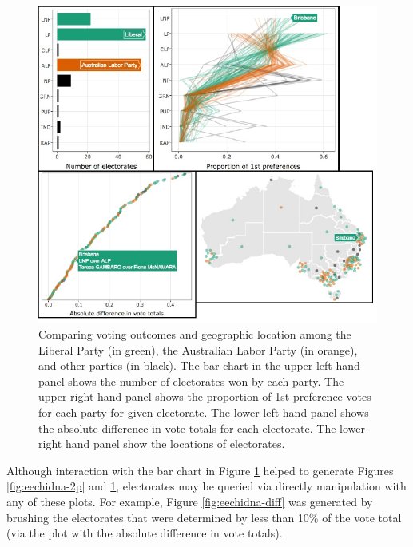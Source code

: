 \documentclass[12pt,]{article}
\theoremstyle{definition}
\theoremstyle{definition}
\theoremstyle{remark}
\begin{document}
\begin{figure}
\centering
\includegraphics{images/eechidna-2p-2.pdf}
\caption{\label{fig:eechidna-2p-2}Comparing voting outcomes and geographic
location among the Liberal Party (in green), the Australian Labor Party
(in orange), and other parties (in black). The bar chart in the
upper-left hand panel shows the number of electorates won by each party.
The upper-right hand panel shows the proportion of 1st preference votes
for each party for given electorate. The lower-left hand panel shows the
absolute difference in vote totals for each electorate. The lower-right
hand panel show the locations of electorates.}
\end{figure}

Although interaction with the bar chart in Figure
\ref{fig:eechidna-2p-2} helped to generate Figures \ref{fig:eechidna-2p}
and \ref{fig:eechidna-2p-2}, electorates may be queried via directly
manipulation with any of these plots. For example, Figure
\ref{fig:eechidna-diff} was generated by brushing the electorates that
were determined by less than 10\% of the vote total (via the plot with
the absolute difference in vote totals).
\end{document}
